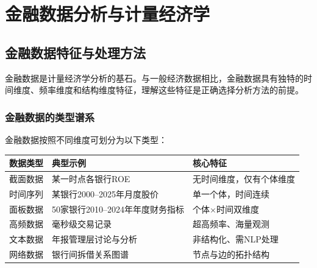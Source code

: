
\chapter{金融数据分析与计量经济学}

\section{金融数据特征与处理方法}

金融数据是计量经济学分析的基石。与一般经济数据相比，金融数据具有独特的时间维度、频率维度和结构维度特征，理解这些特征是正确选择分析方法的前提。

\subsection{金融数据的类型谱系}

金融数据按照不同维度可划分为以下类型：

\begin{table}[H]
\centering
\begin{tabular}{llp{7cm}}
\toprule
\textbf{数据类型} & \textbf{典型示例} & \textbf{核心特征} \\
\midrule
截面数据 & 某一时点各银行ROE & 无时间维度，仅有个体维度 \\
时间序列 & 某银行2000--2025年月度股价 & 单一个体，时间连续 \\
面板数据 & 50家银行2010--2024年年度财务指标 & 个体$\times$时间双维度 \\
高频数据 & 毫秒级交易记录 & 超高频率、海量观测 \\
文本数据 & 年报管理层讨论与分析 & 非结构化、需NLP处理 \\
网络数据 & 银行间拆借关系图谱 & 节点与边的拓扑结构 \\
\bottomrule
\end{tabular}
\end{table}


